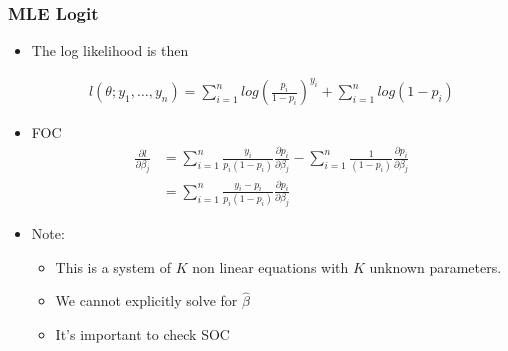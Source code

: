 \documentclass[
  shownotes,
  xcolor={svgnames},
  hyperref={colorlinks,citecolor=DarkBlue,linkcolor=andesred,urlcolor=DarkBlue}
  , aspectratio=169]{beamer}
\begin{document}
\begin{frame}[fragile]
\frametitle{MLE Logit}


\begin{itemize}
  \item The log likelihood is then

\begin{align}
l(\theta;y_1,\dots,y_n)=\sum^n_{i=1}log\left(\frac{p_i}{1-p_i}\right)^{y_i}+\sum^n_{i=1}log(1-p_i)
\end{align}
\item FOC
\begin{align}
\frac{\partial l}{\partial\beta_{j}}&=\sum_{i=1}^{n}\frac{y_{i}}{p_{i}(1-p_{i})}\frac{\partial p_{i}}{\partial\beta_{j}}-\sum_{i=1}^{n}\frac{1}{(1-p_{i})}\frac{\partial p_{i}}{\partial\beta_{j}} \\
&=\sum_{i=1}^{n}\frac{y_{i}-p_{i}}{p_{i}(1-p_{i})}\frac{\partial p_{i}}{\partial\beta_{j}}
\end{align}



  \footnotesize
  \item Note:
  \begin{itemize}
    \footnotesize
    \item This is a system of $K$ non linear equations with $K$ unknown parameters. 
    \item We cannot explicitly solve for $\hat \beta$
    \item It's important to check SOC
  \end{itemize}
\end{itemize}
\end{frame}
\end{document}
